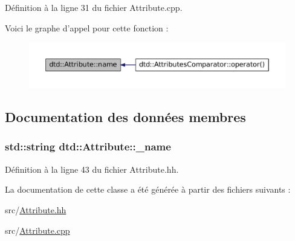 Définition à la ligne 31 du fichier Attribute.cpp.



Voici le graphe d'appel pour cette fonction :\nopagebreak
\begin{figure}[H]
\begin{center}
\leavevmode
\includegraphics[width=400pt]{classdtd_1_1_attribute_a3d1e42a5210df12eaccdb2b2d6ce6147_icgraph}
\end{center}
\end{figure}




\subsection{Documentation des données membres}
\hypertarget{classdtd_1_1_attribute_a1df987474cc5fb17dd4ce699e50443c8}{
\subsubsection[{\_\-name}]{\setlength{\rightskip}{0pt plus 5cm}std::string {\bf dtd::Attribute::\_\-name}}}
\label{classdtd_1_1_attribute_a1df987474cc5fb17dd4ce699e50443c8}


Définition à la ligne 43 du fichier Attribute.hh.



La documentation de cette classe a été générée à partir des fichiers suivants :\begin{DoxyCompactItemize}
\item 
src/\hyperlink{_attribute_8hh}{Attribute.hh}\item 
src/\hyperlink{_attribute_8cpp}{Attribute.cpp}\end{DoxyCompactItemize}
